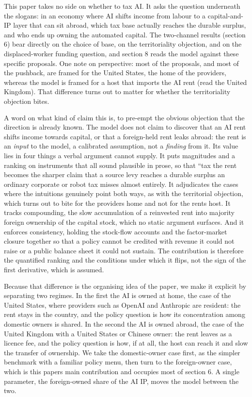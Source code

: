 \documentclass[12pt]{article}
\begin{document}
This paper takes no side on whether to tax AI. It asks the question
underneath the slogans: in an economy where AI shifts income from labour
to a capital-and-IP layer that can sit abroad, which tax base actually
reaches the durable surplus, and who ends up owning the automated
capital. The two-channel results (section 6) bear directly on the choice
of base, on the territoriality objection, and on the displaced-worker
funding question, and section 8 reads the model against these specific
proposals. One note on perspective: most of the proposals, and most of
the pushback, are framed for the United States, the home of the
providers, whereas the model is framed for a host that imports the AI
rent (read the United Kingdom). That difference turns out to matter for
whether the territoriality objection bites.

A word on what kind of claim this is, to pre-empt the obvious objection
that the direction is already known. The model does not claim to
discover that an AI rent shifts income towards capital, or that a
foreign-held rent leaks abroad: the rent is an \emph{input} to the
model, a calibrated assumption, not a \emph{finding} from it. Its value
lies in four things a verbal argument cannot supply. It puts magnitudes
and a ranking on instruments that all sound plausible in prose, so that
``tax the rent\textquotesingle\textquotesingle{} becomes the sharper
claim that a source levy reaches a durable surplus an ordinary corporate
or robot tax misses almost entirely. It adjudicates the cases where the
intuitions genuinely point both ways, as with the territorial objection,
which turns out to bite for the provider\textquotesingle s home and not
for the rent\textquotesingle s host. It tracks compounding, the slow
accumulation of a reinvested rent into majority foreign ownership of the
capital stock, which no static argument surfaces. And it enforces
consistency, holding the stock-flow accounts and the factor-market
closure together so that a policy cannot be credited with revenue it
could not raise or a public balance sheet it could not sustain. The
contribution is therefore the quantified ranking and the conditions
under which it flips, not the sign of the first derivative, which is
assumed.

Because that difference is the organising idea of the paper, we make it
explicit by separating two regimes. In the first the AI is owned at
home, the case of the United States, where providers such as OpenAI and
Anthropic are resident: the rent stays in the country, and the policy
question is how its concentration among domestic owners is shared. In
the second the AI is owned abroad, the case of the United Kingdom with a
United States or Chinese owner: the rent leaves as a licence fee, and
the policy question is how, if at all, the host can reach it and slow
the transfer of ownership. We take the domestic-owner case first, as the
simpler benchmark with a familiar policy menu, then turn to the
foreign-owner case, which is this paper\textquotesingle s main
contribution and occupies most of section 6. A single parameter, the
foreign-owned share of the AI IP, moves the model between the two.
\end{document}
